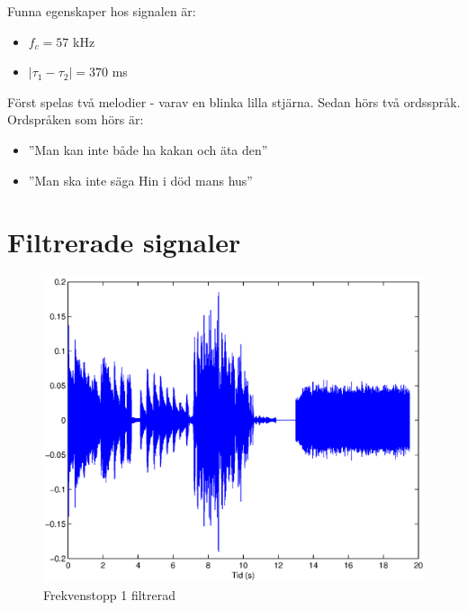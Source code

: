 \documentclass[10pt,twocolumn]{article}
\begin{document}
Funna egenskaper hos signalen är: 

\begin{itemize}
	\item $f_c = 57$ kHz
	\item $|\tau_1 - \tau_2| = 370$ ms
\end{itemize}

Först spelas två melodier - varav en blinka lilla stjärna. Sedan hörs två ordsspråk. Ordspråken som hörs är: 

\begin{itemize}
	\item ''Man kan inte både ha kakan och äta den''
	\item ''Man ska inte säga Hin i död mans hus''
\end{itemize}

\appendix
\pagestyle{empty}
\section{Filtrerade signaler}

\begin{figure}[htp]
  \begin{center}
  \includegraphics[keepaspectratio=true,width=\linewidth]{topp1_filter.eps}  %
  \end{center}
  \caption{Frekvenstopp 1 filtrerad} %
  \label{fig:topp1_filter}
\end{figure}
\end{document}
